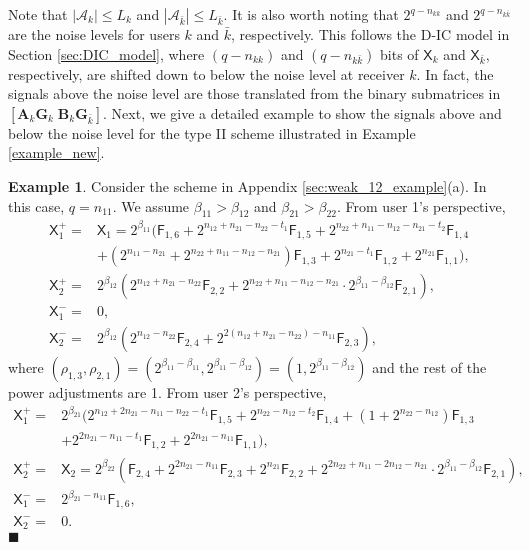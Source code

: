 \documentclass[12pt, draftclsnofoot, onecolumn]{IEEEtran}
\newcommand{\msf}[1]{\mathsf{#1}}
\theoremstyle{definition}
\newtheorem{example}{Example}
\begin{document}
Note that $|\mathcal{A}_k| \leq L_k$ and $|\mathcal{A}_{\bar{k}}| \leq L_{\bar{k}}$. It is also worth noting that $2^{q-n_{kk}}$ and $2^{q-n_{k\bar{k}}}$ are the noise levels for users $k$ and $\bar{k}$, respectively. This follows the D-IC model in Section \ref{sec:DIC_model}, where $(q-n_{kk})$ and $(q-n_{k\bar{k}})$ bits of $\msf{X}_k$ and $\msf{X}_{\bar{k}}$, respectively, are shifted down to below the noise level at receiver $k$. In fact, the signals above the noise level are those translated from the binary submatrices in $[\boldsymbol{A}_k\boldsymbol{G}_k \; \boldsymbol{B}_k\boldsymbol{G}_{\bar{k}}]$. Next, we give a detailed example to show the signals above and below the noise level for the type II scheme illustrated in Example \ref{example_new}.

\begin{example}\label{example:1}
Consider the scheme in Appendix \ref{sec:weak_12_example}(a). In this case, $q =n_{11}$. We assume $\beta_{11}>\beta_{12}$ and $\beta_{21}>\beta_{22}$. From user 1's perspective,
\begin{align}
\msf{X}^{+}_1 =&\msf{X}_1 = 2^{\beta_{11}}(\msf{F}_{1,6}+2^{n_{12}+n_{21}-n_{22}-t_1}\msf{F}_{1,5}+2^{n_{22}+n_{11}-n_{12}-n_{21}-t_2}\msf{F}_{1,4}
\nonumber \\
&+(2^{n_{11}-n_{21}}+2^{n_{22}+n_{11}-n_{12}-n_{21}})\msf{F}_{1,3}+2^{n_{21}-t_1}\msf{F}_{1,2}+2^{n_{21}}\msf{F}_{1,1}), \\
\msf{X}^{+}_2 =&2^{\beta_{12}}(2^{n_{12}+n_{21}-n_{22}}\msf{F}_{2,2}+2^{n_{22}+n_{11}-n_{12}-n_{21}}\cdot2^{\beta_{11}-\beta_{12}}\msf{F}_{2,1}),\\
\msf{X}^{-}_1 =&0,\\
\msf{X}^{-}_2 =&2^{\beta_{12}}(2^{n_{12}-n_{22}}\msf{F}_{2,4}+2^{2(n_{12}+n_{21}-n_{22})-n_{11}}\msf{F}_{2,3}),
\end{align}
where $(\rho_{1,3},\rho_{2,1})=(2^{\beta_{11}-\beta_{11}},2^{\beta_{11}-\beta_{12}})=(1,2^{\beta_{11}-\beta_{12}})$ and the rest of the power adjustments are 1. From user 2's perspective,
\begin{align}
\msf{X}^{+}_1  =& 2^{\beta_{21}}(2^{n_{12}+2n_{21}-n_{11}-n_{22}-t_1}\msf{F}_{1,5}+2^{n_{22}-n_{12}-t_2}\msf{F}_{1,4}
+(1+2^{n_{22}-n_{12}})\msf{F}_{1,3} \nonumber \\
&+2^{2n_{21}-n_{11}-t_1}\msf{F}_{1,2}+2^{2n_{21}-n_{11}}\msf{F}_{1,1}), \\
\msf{X}^{+}_2 =&\msf{X}_2 =2^{\beta_{22}}(\msf{F}_{2,4}+2^{2n_{21}-n_{11}}\msf{F}_{2,3}+2^{n_{21}}\msf{F}_{2,2}+2^{2n_{22}+n_{11}-2n_{12}-n_{21}}\cdot 2^{\beta_{11}-\beta_{12}}\msf{F}_{2,1}),\\
\msf{X}^{-}_1 =&2^{\beta_{21}-n_{11}}\msf{F}_{1,6},\\
\msf{X}^{-}_2 =&0.
\end{align}
\hspace{16.0cm}$\blacksquare$
\end{example}
\end{document}
